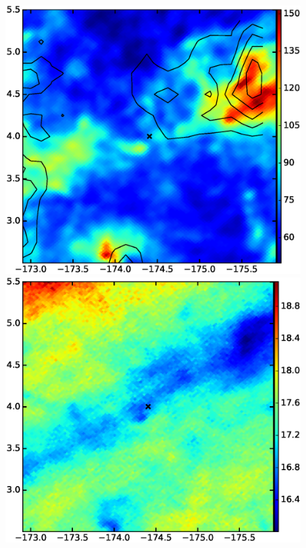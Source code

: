 \documentclass[preprint]{emulateapj}
\begin{document}
\begin{figure}
\includegraphics[scale=0.21]{fig/src_eg_apd0_r1c2.eps}
\includegraphics[scale=0.21]{fig/src_eg_apd0_r1c3.eps}
%


\end{figure}
\end{document}
